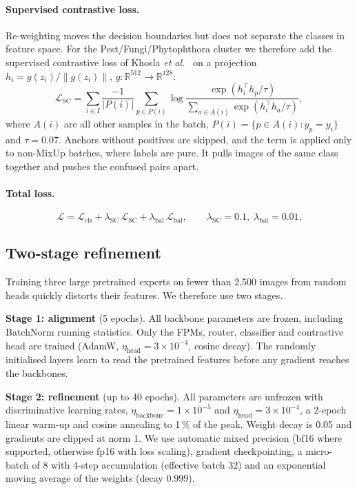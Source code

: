 \paragraph{Supervised contrastive loss.}
Re-weighting moves the decision boundaries but does not separate the classes in
feature space. For the Pest/Fungi/Phytophthora cluster we therefore add the
supervised contrastive loss of Khosla \emph{et al.}~\cite{khosla2020supcon} on a projection
$h_i = g(z_i)/\lVert g(z_i)\rVert$, $g:\mathbb{R}^{512}\!\to\!\mathbb{R}^{128}$:
\begin{equation}
\mathcal{L}_{\mathrm{SC}} = \sum_{i\in I}\frac{-1}{|P(i)|}\sum_{p\in P(i)}
\log\frac{\exp(h_i^{\top}h_p/\tau)}{\sum_{a\in A(i)}\exp(h_i^{\top}h_a/\tau)},
\end{equation}
where $A(i)$ are all other samples in the batch, $P(i)=\{p\in A(i): y_p=y_i\}$ and
$\tau=0.07$. Anchors without positives are skipped, and the term is applied only
to non-MixUp batches, where labels are pure. It pulls images of the same class
together and pushes the confused pairs apart.

\paragraph{Total loss.}
\begin{equation}
\mathcal{L} = \mathcal{L}_{\mathrm{cls}} + \lambda_{\mathrm{SC}}\,\mathcal{L}_{\mathrm{SC}} + \lambda_{\mathrm{bal}}\,\mathcal{L}_{\mathrm{bal}},
\qquad \lambda_{\mathrm{SC}}=0.1,\; \lambda_{\mathrm{bal}}=0.01.
\end{equation}

\subsection{Two-stage refinement}
\label{sec:method_twostage}

Training three large pretrained experts on fewer than 2{,}500 images from random
heads quickly distorts their features. We therefore use two stages.

\textbf{Stage 1: alignment} (5 epochs). All backbone parameters are frozen,
including BatchNorm running statistics. Only the FPMs, router, classifier and
contrastive head are trained (AdamW, $\eta_{\mathrm{head}}=3\times10^{-4}$, cosine
decay). The randomly initialised layers learn to read the pretrained features
before any gradient reaches the backbones.

\textbf{Stage 2: refinement} (up to 40 epochs). All parameters are unfrozen with
discriminative learning rates, $\eta_{\mathrm{backbone}}=1\times10^{-5}$ and
$\eta_{\mathrm{head}}=3\times10^{-4}$, a 2-epoch linear warm-up and cosine
annealing to 1\,\% of the peak. Weight decay is 0.05 and gradients are clipped at
norm 1. We use automatic mixed precision (bf16 where supported, otherwise fp16
with loss scaling), gradient checkpointing, a micro-batch of 8 with 4-step
accumulation (effective batch 32) and an exponential moving average of the
weights (decay $0.999$).

